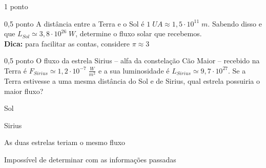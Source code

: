 \documentclass{../lista}
\begin{document}
\begin{questao}{1 ponto}
		\begin{pergunta}{0,5 ponto}
			A distância entre a Terra e o Sol é $1 \; UA \approx 1,5 \cdot 10^{11} \; m$. Sabendo disso e que $L_{Sol} \simeq 3,8 \cdot 10^{26} \; W$, determine o fluxo solar que recebemos. \\
			\textbf{Dica:} para facilitar as contas, considere $\pi \approx 3$

			\espacoCalculo
			\espacoRespostaPergunta
		\end{pergunta}

		\begin{pergunta}{0,5 ponto}
			O fluxo da estrela Sirius -- alfa da constelação Cão Maior -- recebido na Terra é $F_{Sirius} \simeq 1,2 \cdot 10^{-7} \; \frac{W}{m^2}$ e a sua luminosidade é $L_{Sirius} \simeq 9,7 \cdot 10^{27}$. Se a Terra estivesse a uma mesma distância do Sol e de Sirius, qual estrela possuiria o maior fluxo?

			\begin{alternativas}
				\item Sol
				\item Sirius
				\item As duas estrelas teriam o mesmo fluxo
				\item Impossível de determinar com as informações passadas
			\end{alternativas}
		\end{pergunta}
	\end{questao}
\end{document}
